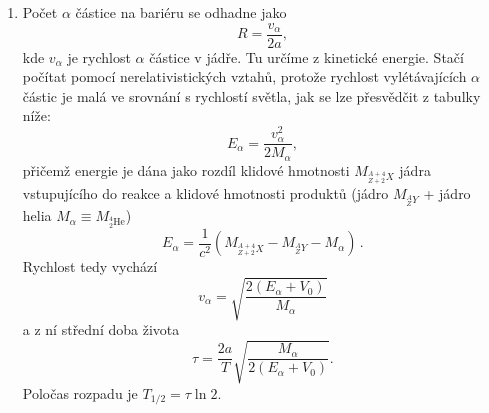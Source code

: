 \begin{solution}
\begin{enumerate}
	\item
		Počet  $\alpha$ částice na bariéru se odhadne jako
		\begin{equation}
			R=\frac{v_{\alpha}}{2a},
		\end{equation}
		kde $v_{\alpha}$ je rychlost $\alpha$ částice v jádře.
		Tu určíme z kinetické energie.
		Stačí počítat pomocí nerelativistických vztahů, protože rychlost vylétávajících $\alpha$ částic je malá ve srovnání s rychlostí světla, jak se lze přesvědčit z tabulky níže:
		\begin{equation}
			E_{\alpha}=\frac{v_{\alpha}^{2}}{2M_{\alpha}},
		\end{equation}
		přičemž energie je dána jako rozdíl klidové hmotnosti $M_{{}^{A+4}_{Z+2}X}$ jádra vstupujícího do reakce a klidové hmotnosti produktů (jádro $M_{{}^{A}_{Z}Y}$ + jádro helia $M_{\alpha}\equiv M_{{}^{4}_{2}\mathrm{He}}$)
		\begin{equation}
			E_{\alpha}=\frac{1}{c^{2}}\left(M_{{}^{A+4}_{Z+2}X}-M_{{}^{A}_{Z}Y}-M_{\alpha}\right)\,.
		\end{equation}
		Rychlost tedy vychází
		\begin{equation}
			v_{\alpha}=\sqrt{\frac{2\left(E_{\alpha}+V_{0}\right)}{M_{\alpha}}}
		\end{equation}
		a z ní střední doba života
		\begin{equation}
			\tau=\frac{2a}{T}\sqrt{\frac{M_{\alpha}}{2\left(E_{\alpha}+V_{0}\right)}}.
		\end{equation}
		Poločas rozpadu je $T_{1/2}=\tau\ln2$.


\end{enumerate}
\end{solution}
